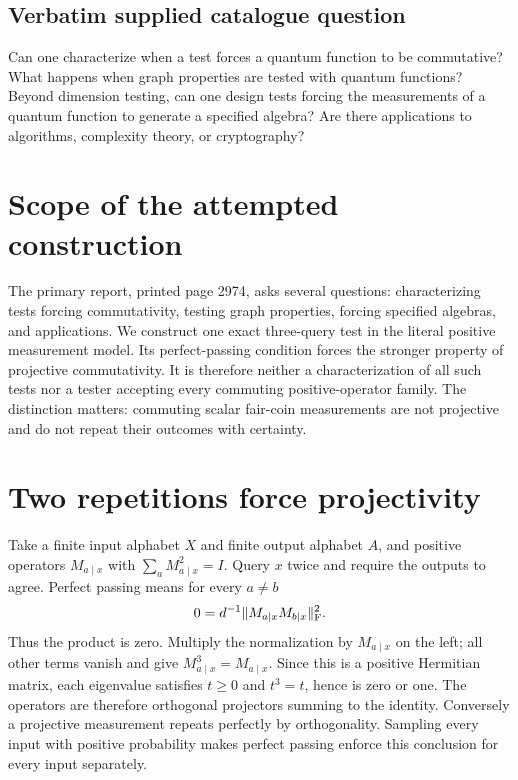 \documentclass[11pt]{article}
\begin{document}
\subsection{Verbatim supplied catalogue question}
Can one characterize when a test forces a quantum function to be commutative? What happens when graph properties are tested with quantum functions? Beyond dimension testing, can one design tests forcing the measurements of a quantum function to generate a specified algebra? Are there applications to algorithms, complexity theory, or cryptography?

\section{Scope of the attempted construction}
The primary report, printed page 2974, asks several questions:
characterizing tests forcing commutativity, testing graph
properties, forcing specified algebras, and applications. We
construct one exact three-query test in the literal positive
measurement model. Its perfect-passing condition forces the
stronger property of projective commutativity. It is therefore
neither a characterization of all such tests nor a tester accepting
every commuting positive-operator family. The distinction matters:
commuting scalar fair-coin measurements are not projective and
do not repeat their outcomes with certainty.

\section{Two repetitions force projectivity}
Take a finite input alphabet $X$ and finite output alphabet $A$,
and positive operators $M_{a\mid x}$ with
$\sum_aM_{a\mid x}^2=I$. Query $x$ twice and require the outputs
to agree. Perfect passing means for every $a\ne b$
\[
 0=d^{-1}\|M_{a\mid x}M_{b\mid x}\|_{\rm F}^2.
\]
Thus the product is zero. Multiply the normalization by
$M_{a\mid x}$ on the left; all other terms vanish and give
$M_{a\mid x}^3=M_{a\mid x}$. Since this is a positive
Hermitian matrix, each eigenvalue satisfies $t\ge0$ and
$t^3=t$, hence is zero or one. The operators are therefore
orthogonal projectors summing to the identity. Conversely a
projective measurement repeats perfectly by orthogonality.
Sampling every input with positive probability makes perfect
passing enforce this conclusion for every input separately.
\end{document}
